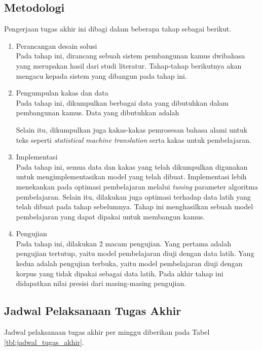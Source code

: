 \documentclass[../main/main.tex]{subfiles}
\begin{document}
\subsection{Metodologi}
Pengerjaan tugas akhir ini dibagi dalam beberapa tahap sebagai berikut.
\begin{enumerate}
\item Perancangan desain solusi\\
Pada tahap ini, dirancang sebuah sistem pembangunan kamus dwibahasa yang merupakan hasil dari studi literatur. Tahap-tahap berikutnya akan mengacu kepada sistem yang dibangun pada tahap ini.
\item Pengumpulan kakas dan data\\
Pada tahap ini, dikumpulkan berbagai data yang dibutuhkan dalam pembangunan kamus. Data yang dibutuhkan adalah
Selain itu, dikumpulkan juga kakas-kakas pemrosesan bahasa alami untuk teks seperti \textit{statistical machine translation} serta kakas untuk pembelajaran.
\item Implementasi\\
Pada tahap ini, semua data dan kakas yang telah dikumpulkan digunakan untuk mengimplementasikan model yang telah dibuat. Implementasi lebih menekankan pada optimasi pembelajaran melalui \textit{tuning} parameter algoritma pembelajaran. Selain itu, dilakukan juga optimasi terhadap data latih yang telah dibuat pada tahap sebelumnya. Tahap ini menghasilkan sebuah model pembelajaran yang dapat dipakai untuk membangun kamus.
\item Pengujian\\
Pada tahap ini, dilakukan 2 macam pengujian. Yang pertama adalah pengujian tertutup, yaitu model pembelajaran diuji dengan data latih. Yang kedua adalah pengujian terbuka, yaitu model pembelajaran diuji dengan korpus yang tidak dipakai sebagai data latih. Pada akhir tahap ini didapatkan nilai presisi dari masing-masing pengujian.
\end{enumerate}

\subsection{Jadwal Pelaksanaan Tugas Akhir}
Jadwal pelaksanaan tugas akhir per minggu diberikan pada Tabel \ref{tbl:jadwal_tugas_akhir}.
\end{document}
